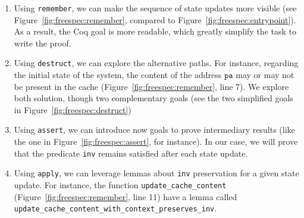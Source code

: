 \documentclass[oneside,a4paper]{memoir}
\theoremstyle{break}
\begin{document}
\begin{enumerate}
\item Using \texttt{remember}, we can make the sequence of state updates more
  visible (see Figure~\ref{fig:freespec:remember}, compared to
  Figure~\ref{fig:freespec:entrypoint}).
  As a result, the Coq goal is more readable, which greatly simplify the task to
  write the proof.
\item Using \texttt{destruct}, we can explore the alternative paths.
  For instance, regarding the initial state of the system, the content of the
  address \( \mathtt{pa} \) may or may not be present in the cache
  (Figure~\ref{fig:freespec:remember}, line 7).
  We explore both solution, though two complementary goals (see the two
  simplified goals in Figure~\ref{fig:freespec:destruct})
\item Using \texttt{assert}, we can introduce now goals to prove intermediary
  results (like the one in Figure~\ref{fig:freespec:assert}, for instance).
  In our case, we will prove that the predicate \texttt{inv} remains satisfied
  after each state update.
\item Using \texttt{apply}, we can leverage lemmas about \texttt{inv}
  preservation for a given state update.
  For instance, the function \texttt{update\_cache\_content}
  (Figure~\ref{fig:freespec:remember}, line 11) have a lemma called
  \texttt{update\_cache\_content\_with\_context\_preserves\_inv}.
\end{enumerate}
\end{document}
